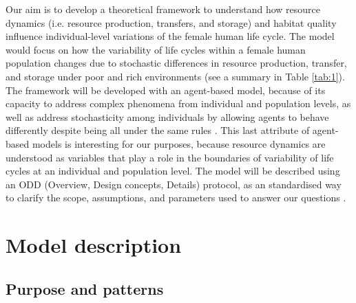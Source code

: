 \documentclass{article}
\begin{document}
Our aim is to develop a theoretical framework to understand how resource dynamics (i.e. resource production, transfers, and storage) and habitat quality influence individual-level variations of the female human life cycle. The model would focus on how the variability of life cycles within a female human population changes due to stochastic differences in resource production, transfer, and storage under poor and rich environments (see a summary in Table \ref{tab:1}). The framework will be developed with an agent-based model, because of its capacity to address complex phenomena from individual and population levels, as well as address stochasticity among individuals by allowing agents to behave differently despite being all under the same rules \citep{judson1994rise,wilensky2015introduction}. This last attribute of agent-based models is interesting for our purposes, because resource dynamics are understood as variables that play a role in the boundaries of variability of life cycles at an individual and population level. The model will be described using an ODD (Overview, Design concepts, Details) protocol, as an standardised way to clarify the scope, assumptions, and parameters used to answer our questions \citep{grimm2006standard,grimm2020odd}.

\section{Model description}

\subsection{Purpose and patterns}
\end{document}
